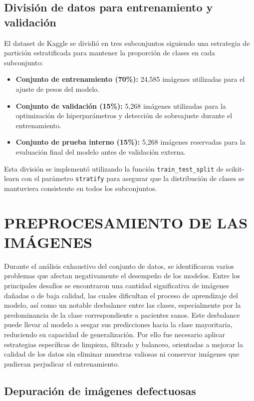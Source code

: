 \subsection{División de datos para entrenamiento y validación}

El dataset de Kaggle se dividió en tres subconjuntos siguiendo una estrategia de partición estratificada para mantener la proporción de clases en cada subconjunto:

\begin{itemize}
    \item \textbf{Conjunto de entrenamiento (70\%):} 24,585 imágenes utilizadas para el ajuste de pesos del modelo.
    \item \textbf{Conjunto de validación (15\%):} 5,268 imágenes utilizadas para la optimización de hiperparámetros y detección de sobreajuste durante el entrenamiento.
    \item \textbf{Conjunto de prueba interno (15\%):} 5,268 imágenes reservadas para la evaluación final del modelo antes de validación externa.
\end{itemize}

Esta división se implementó utilizando la función \texttt{train\_test\_split} de scikit-learn con el parámetro \texttt{stratify} para asegurar que la distribución de clases se mantuviera consistente en todos los subconjuntos.

\section{PREPROCESAMIENTO DE LAS IMÁGENES}

Durante el análisis exhaustivo del conjunto de datos, se identificaron varios problemas que afectan negativamente el desempeño de los modelos. Entre los principales desafíos se encontraron una cantidad significativa de imágenes dañadas o de baja calidad, las cuales dificultan el proceso de aprendizaje del modelo, así como un notable desbalance entre las clases, especialmente por la predominancia de la clase correspondiente a pacientes sanos. Este desbalance puede llevar al modelo a sesgar sus predicciones hacia la clase mayoritaria, reduciendo su capacidad de generalización. Por ello fue necesario aplicar estrategias específicas de limpieza, filtrado y balanceo, orientadas a mejorar la calidad de los datos sin eliminar muestras valiosas ni conservar imágenes que pudieran perjudicar el entrenamiento.

\subsection{Depuración de imágenes defectuosas}

